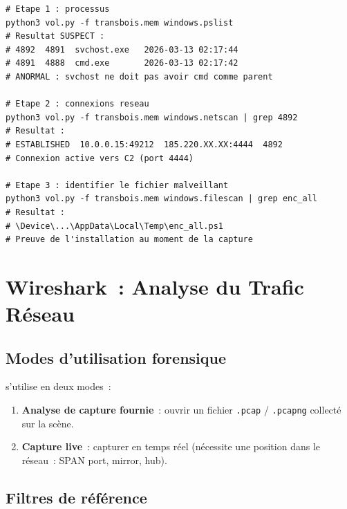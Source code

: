 \begin{lstlisting}[language=bash_forensique,
    caption={Analyse Volatility. Opération MVOM TRANSBOIS SA}]
# Etape 1 : processus
python3 vol.py -f transbois.mem windows.pslist
# Resultat SUSPECT :
# 4892  4891  svchost.exe   2026-03-13 02:17:44
# 4891  4888  cmd.exe       2026-03-13 02:17:42
# ANORMAL : svchost ne doit pas avoir cmd comme parent

# Etape 2 : connexions reseau
python3 vol.py -f transbois.mem windows.netscan | grep 4892
# Resultat :
# ESTABLISHED  10.0.0.15:49212  185.220.XX.XX:4444  4892
# Connexion active vers C2 (port 4444)

# Etape 3 : identifier le fichier malveillant
python3 vol.py -f transbois.mem windows.filescan | grep enc_all
# Resultat :
# \Device\...\AppData\Local\Temp\enc_all.ps1
# Preuve de l'installation au moment de la capture
\end{lstlisting}

\section{Wireshark~: Analyse du Trafic Réseau}
\label{sec:wireshark}

\subsection{Modes d'utilisation forensique}

 s'utilise en deux modes~:
\begin{enumerate}
    \item \textbf{Analyse de capture fournie}~: ouvrir un fichier
          \texttt{.pcap} / \texttt{.pcapng} collecté sur la scène.
    \item \textbf{Capture live}~: capturer en temps réel (nécessite
          une position dans le réseau~: SPAN port, mirror, hub).
\end{enumerate}

\subsection{Filtres de référence}

